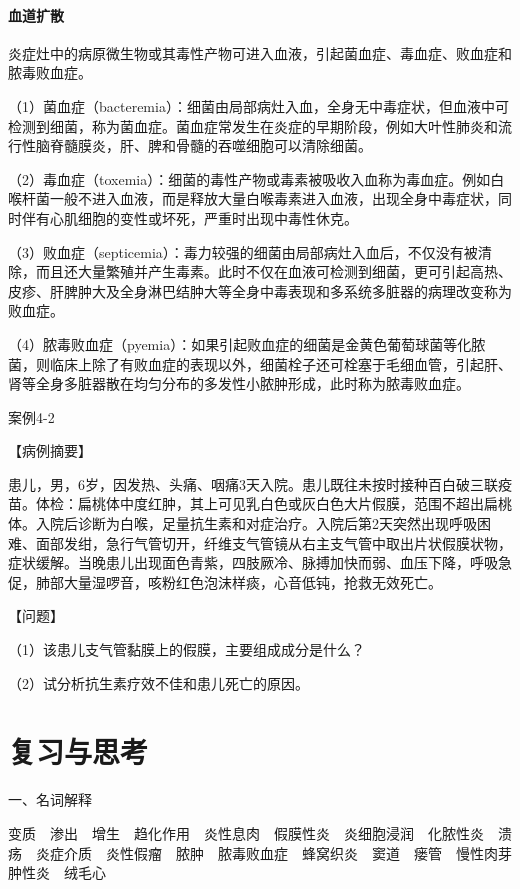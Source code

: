 \paragraph{血道扩散}
炎症灶中的病原微生物或其毒性产物可进入血液，引起菌血症、毒血症、败血症和脓毒败血症。

（1）菌血症（bacteremia）：细菌由局部病灶入血，全身无中毒症状，但血液中可检测到细菌，称为菌血症。菌血症常发生在炎症的早期阶段，例如大叶性肺炎和流行性脑脊髓膜炎，肝、脾和骨髓的吞噬细胞可以清除细菌。

（2）毒血症（toxemia）：细菌的毒性产物或毒素被吸收入血称为毒血症。例如白喉杆菌一般不进入血液，而是释放大量白喉毒素进入血液，出现全身中毒症状，同时伴有心肌细胞的变性或坏死，严重时出现中毒性休克。

（3）败血症（septicemia）：毒力较强的细菌由局部病灶入血后，不仅没有被清除，而且还大量繁殖并产生毒素。此时不仅在血液可检测到细菌，更可引起高热、皮疹、肝脾肿大及全身淋巴结肿大等全身中毒表现和多系统多脏器的病理改变称为败血症。

（4）脓毒败血症（pyemia）：如果引起败血症的细菌是金黄色葡萄球菌等化脓菌，则临床上除了有败血症的表现以外，细菌栓子还可栓塞于毛细血管，引起肝、肾等全身多脏器散在均匀分布的多发性小脓肿形成，此时称为脓毒败血症。

\begin{framed}
  {案例4-2}

  {【病例摘要】}

  患儿，男，6岁，因发热、头痛、咽痛3天入院。患儿既往未按时接种百白破三联疫苗。体检：扁桃体中度红肿，其上可见乳白色或灰白色大片假膜，范围不超出扁桃体。入院后诊断为白喉，足量抗生素和对症治疗。入院后第2天突然出现呼吸困难、面部发绀，急行气管切开，纤维支气管镜从右主支气管中取出片状假膜状物，症状缓解。当晚患儿出现面色青紫，四肢厥冷、脉搏加快而弱、血压下降，呼吸急促，肺部大量湿啰音，咳粉红色泡沫样痰，心音低钝，抢救无效死亡。

  {【问题】}

  （1）该患儿支气管黏膜上的假膜，主要组成成分是什么？

  （2）试分析抗生素疗效不佳和患儿死亡的原因。
\end{framed}

\section*{复习与思考}

{一、名词解释}

变质　渗出　增生　趋化作用　炎性息肉　假膜性炎　炎细胞浸润　化脓性炎　溃疡　炎症介质　炎性假瘤　脓肿　脓毒败血症　蜂窝织炎　窦道　瘘管　慢性肉芽肿性炎　绒毛心


